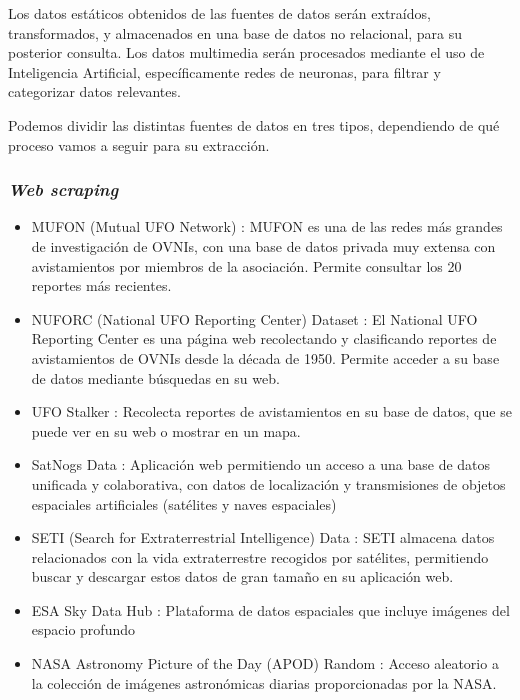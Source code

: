 Los datos estáticos obtenidos de las fuentes de datos serán extraídos, transformados, y almacenados en una base de datos no relacional, para su posterior consulta. Los datos multimedia serán procesados mediante el uso de Inteligencia Artificial, específicamente redes de neuronas, para filtrar y categorizar datos relevantes.


Podemos dividir las distintas fuentes de datos en tres tipos, dependiendo de qué proceso vamos a seguir para su extracción.


\subsubsection*{\textit{Web scraping}}
\begin{itemize}
  \item MUFON (Mutual UFO Network) \cite{mufon-scraping}: MUFON es una de las redes más grandes de investigación de OVNIs, con una base de datos privada muy extensa con avistamientos por miembros de la asociación. Permite consultar los 20 reportes más recientes.
  \item NUFORC (National UFO Reporting Center) Dataset \cite{nuforc-scraping}: El National UFO Reporting Center es una página web recolectando y clasificando reportes de avistamientos de OVNIs desde la década de 1950. Permite acceder a su base de datos mediante búsquedas en su web.
  \item UFO Stalker \cite{ufostalker-scraping}: Recolecta reportes de avistamientos en su base de datos, que se puede ver en su web o mostrar en un mapa.
  \item SatNogs Data \cite{satnogs-scraping}: Aplicación web permitiendo un acceso a una base de datos unificada y colaborativa, con datos de localización y transmisiones de objetos espaciales artificiales (satélites y naves espaciales)
  \item SETI (Search for Extraterrestrial Intelligence) Data \cite{seti-scraping}: SETI almacena datos relacionados con la vida extraterrestre recogidos por satélites, permitiendo buscar y descargar estos datos de gran tamaño en su aplicación web.
  \item ESA Sky Data Hub \cite{esa-sky-scraping}: Plataforma de datos espaciales que incluye imágenes del espacio profundo
  \item NASA Astronomy Picture of the Day (APOD) Random \cite{nasa-apod-scraping}: Acceso aleatorio a la colección de imágenes astronómicas diarias proporcionadas por la NASA.
\end{itemize}


